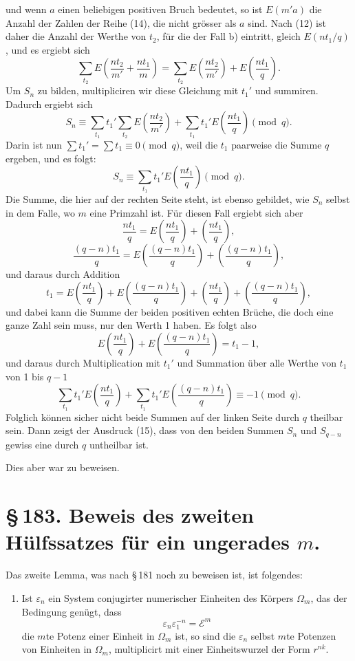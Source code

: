 \documentclass[11pt]{article}
\begin{document}
und wenn $a$ einen beliebigen positiven Bruch bedeutet, so ist $E(m'a)$ die Anzahl der Zahlen der Reihe (14), die nicht grösser als $a$ sind. Nach (12) ist daher die Anzahl der Werthe von $t_2$, für die der Fall b) eintritt, gleich $E(nt_1/q)$, und es ergiebt sich
\[
\sum_{t_2}E\left(\frac{nt_2}{m'}+\frac{nt_1}{m}\right)
=
\sum_{t_2}E\left(\frac{nt_2}{m'}\right)+E\left(\frac{nt_1}{q}\right).
\]
Um $S_n$ zu bilden, multipliciren wir diese Gleichung mit $t_1'$ und summiren. Dadurch ergiebt sich
\[
S_n\equiv \sum_{t_1}t_1'\sum_{t_2}E\left(\frac{nt_2}{m'}\right)+\sum_{t_1}t_1'E\left(\frac{nt_1}{q}\right)\pmod q.
\]
Darin ist nun $\sum t_1'=\sum t_1\equiv0\pmod q$, weil die $t_1$ paarweise die Summe $q$ ergeben, und es folgt:
\begin{equation}
S_n\equiv\sum_{t_1}t_1'E\left(\frac{nt_1}{q}\right)\pmod q.
\tag{15}
\end{equation}
Die Summe, die hier auf der rechten Seite steht, ist ebenso gebildet, wie $S_n$ selbst in dem Falle, wo $m$ eine Primzahl ist. Für diesen Fall ergiebt sich aber
\[
\frac{nt_1}{q}=E\left(\frac{nt_1}{q}\right)+\left(\frac{nt_1}{q}\right),
\]
\[
\frac{(q-n)t_1}{q}=E\left(\frac{(q-n)t_1}{q}\right)+\left(\frac{(q-n)t_1}{q}\right),
\]
und daraus durch Addition
\[
t_1=E\left(\frac{nt_1}{q}\right)+E\left(\frac{(q-n)t_1}{q}\right)+\left(\frac{nt_1}{q}\right)+\left(\frac{(q-n)t_1}{q}\right),
\]
und dabei kann die Summe der beiden positiven echten Brüche, die doch eine ganze Zahl sein muss, nur den Werth 1 haben. Es folgt also
\[
E\left(\frac{nt_1}{q}\right)+E\left(\frac{(q-n)t_1}{q}\right)=t_1-1,
\]
und daraus durch Multiplication mit $t_1'$ und Summation über alle Werthe von $t_1$ von 1 bis $q-1$
\[
\sum_{t_1}t_1'E\left(\frac{nt_1}{q}\right)+\sum_{t_1}t_1'E\left(\frac{(q-n)t_1}{q}\right)\equiv -1\pmod q.
\]
Folglich können sicher nicht beide Summen auf der linken Seite durch $q$ theilbar sein. Dann zeigt der Ausdruck (15), dass von den beiden Summen $S_n$ und $S_{q-n}$ gewiss eine durch $q$ untheilbar ist.

Dies aber war zu beweisen.

\section*{\S\,183. Beweis des zweiten Hülfssatzes für ein ungerades $m$.}

Das zweite Lemma, was nach \S\,181 noch zu beweisen ist, ist folgendes:

\begin{enumerate}[label=\arabic*.,leftmargin=2.2em,start=2]
\item Ist $\varepsilon_n$ ein System conjugirter numerischer Einheiten des Körpers $\Omega_m$, das der Bedingung genügt, dass
\begin{equation}
\varepsilon_n\varepsilon_1^{-n}=\mathscr E^m
\tag{1}
\end{equation}
die $m$te Potenz einer Einheit in $\Omega_m$ ist, so sind die $\varepsilon_n$ selbst $m$te Potenzen von Einheiten in $\Omega_m$, multiplicirt mit einer Einheitswurzel der Form $r^{nk}$.
\end{enumerate}
\end{document}
